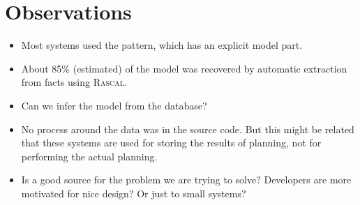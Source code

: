\documentclass[a4paper, oneside, notitlepage]{article}
\newcommand{\Rascal}{\textsc{Rascal}\xspace}
\begin{document}
\section{Observations}

\begin{itemize}
	\item Most  systems used the  pattern,
	which has an explicit model part.

	\item About 85\% (estimated) of the model was recovered by automatic
	extraction from  facts using \Rascal.

	\item Can we infer the model from the database?

	\item No process around the data was in the source code. But this might be
	related that these systems are used for storing the results of planning, not
	for performing the actual planning.

	\item Is  a good source for the problem we are trying to
	solve? Developers are more motivated for nice design? Or just to small
	systems?

\end{itemize}
\end{document}
